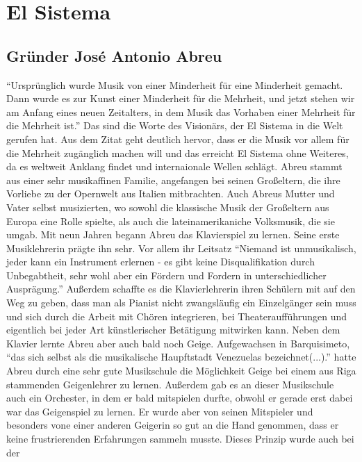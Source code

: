 \section{El Sistema}

\subsection{Gründer José Antonio Abreu}
\enquote{Ursprünglich wurde Musik von einer Minderheit für eine Minderheit
gemacht. Dann wurde es zur Kunst einer Minderheit für die Mehrheit, und jetzt
stehen wir am Anfang eines neuen Zeitalters, in dem Musik das Vorhaben einer
Mehrheit für die Mehrheit ist.} \autocite[5]{kaufmann:el_sistema} Das sind die
Worte des Visionärs, der El Sistema in die Welt gerufen hat. Aus dem Zitat geht
deutlich hervor, dass er die Musik vor allem für die Mehrheit zugänglich machen
will und das erreicht El Sistema ohne Weiteres, da es weltweit Anklang findet
und internaionale Wellen schlägt. Abreu stammt aus einer sehr musikaffinen
Familie, angefangen bei seinen Großeltern, die ihre Vorliebe zu der Opernwelt
aus Italien mitbrachten. Auch Abreus Mutter und Vater selbst musizierten, wo
sowohl die klassische Musik der Großeltern aus Europa eine Rolle spielte, als
auch die lateinamerikaniche Volksmusik, die sie umgab. Mit neun Jahren begann
Abreu das Klavierspiel zu lernen. Seine erste Musiklehrerin prägte ihn sehr. Vor
allem ihr Leitsatz \enquote{Niemand ist unmusikalisch, jeder kann ein Instrument
erlernen - es gibt keine Disqualifikation durch Unbegabtheit, sehr wohl aber ein
Fördern und Fordern in unterschiedlicher Ausprägung.}
\autocite[20]{kaufmann:el_sistema} Außerdem schaffte es die Klavierlehrerin
ihren Schülern mit auf den Weg zu geben, dass man als Pianist nicht zwangsläufig
ein Einzelgänger sein muss und sich durch die Arbeit mit Chören integrieren, bei
Theateraufführungen und eigentlich bei jeder Art künstlerischer Betätigung
mitwirken kann. Neben dem Klavier lernte Abreu aber auch bald noch Geige.
Aufgewachsen in Barquisimeto, \enquote{das sich selbst als die musikalische
Haupftstadt Venezuelas bezeichnet(...).} \autocite[22]{kaufmann:el_sistema}
hatte Abreu durch eine sehr gute Musikschule die Möglichkeit Geige bei einem aus
Riga stammenden Geigenlehrer zu lernen. Außerdem gab es an dieser Musikschule
auch ein Orchester, in dem er bald mitspielen durfte, obwohl er gerade erst
dabei war das Geigenspiel zu lernen. Er wurde aber von seinen Mitspieler und
besonders vone einer anderen Geigerin so gut an die Hand genommen, dass er keine
frustrierenden Erfahrungen sammeln musste. Dieses Prinzip wurde auch bei der
